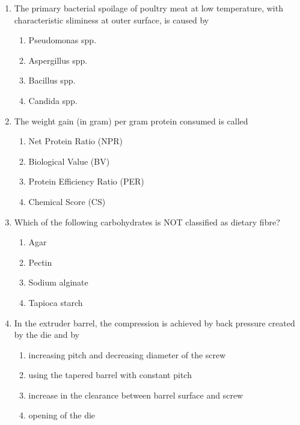 \documentclass[journal,12pt,onecolumn]{IEEEtran}
\theoremstyle{remark}
\begin{document}
\begin{enumerate}
\item The primary bacterial spoilage of poultry meat at low temperature, with characteristic sliminess at outer surface, is caused by
\begin{multicols}{4}
\begin{enumerate}
\item Pseudomonas spp.
\item Aspergillus spp.
\item Bacillus spp.
\item Candida spp.
\end{enumerate}
\end{multicols}

\item The weight gain (in gram) per gram protein consumed is called
\begin{multicols}{2}
\begin{enumerate}
\item Net Protein Ratio (NPR)
\item Biological Value (BV)
\item Protein Efficiency Ratio (PER)
\item Chemical Score (CS)
\end{enumerate}
\end{multicols}

\item Which of the following carbohydrates is NOT classified as dietary fibre?
\begin{multicols}{4}
\begin{enumerate}
\item Agar
\item Pectin
\item Sodium alginate
\item Tapioca starch
\end{enumerate}
\end{multicols}

\item In the extruder barrel, the compression is achieved by back pressure created by the die and by
\begin{multicols}{2}
\begin{enumerate}
\item increasing pitch and decreasing diameter of the screw
\item using the tapered barrel with constant pitch
\item increase in the clearance between barrel surface and screw
\item opening of the die
\end{enumerate}
\end{multicols}


\end{enumerate}
\end{document}
